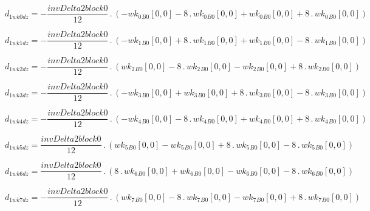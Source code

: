 \documentclass{article}
\begin{document}
\begin{dmath}d_{1 wk0 dz} = - \frac{invDelta2block0}{12} \,.\, \left(- {wk_{0}{_{B0}}}[{0,0}] - 8 \,.\, {wk_{0}{_{B0}}}[{0,0}] + {wk_{0}{_{B0}}}[{0,0}] + 8 \,.\, {wk_{0}{_{B0}}}[{0,0}]\right)\end{dmath}

\begin{dmath}d_{1 wk1 dz} = - \frac{invDelta2block0}{12} \,.\, \left(- {wk_{1}{_{B0}}}[{0,0}] + 8 \,.\, {wk_{1}{_{B0}}}[{0,0}] + {wk_{1}{_{B0}}}[{0,0}] - 8 \,.\, {wk_{1}{_{B0}}}[{0,0}]\right)\end{dmath}

\begin{dmath}d_{1 wk2 dz} = - \frac{invDelta2block0}{12} \,.\, \left({wk_{2}{_{B0}}}[{0,0}] - 8 \,.\, {wk_{2}{_{B0}}}[{0,0}] - {wk_{2}{_{B0}}}[{0,0}] + 8 \,.\, {wk_{2}{_{B0}}}[{0,0}]\right)\end{dmath}

\begin{dmath}d_{1 wk3 dz} = - \frac{invDelta2block0}{12} \,.\, \left(- {wk_{3}{_{B0}}}[{0,0}] + {wk_{3}{_{B0}}}[{0,0}] + 8 \,.\, {wk_{3}{_{B0}}}[{0,0}] - 8 \,.\, {wk_{3}{_{B0}}}[{0,0}]\right)\end{dmath}

\begin{dmath}d_{1 wk4 dz} = - \frac{invDelta2block0}{12} \,.\, \left(- {wk_{4}{_{B0}}}[{0,0}] - 8 \,.\, {wk_{4}{_{B0}}}[{0,0}] + {wk_{4}{_{B0}}}[{0,0}] + 8 \,.\, {wk_{4}{_{B0}}}[{0,0}]\right)\end{dmath}

\begin{dmath}d_{1 wk5 dz} = \frac{invDelta2block0}{12} \,.\, \left({wk_{5}{_{B0}}}[{0,0}] - {wk_{5}{_{B0}}}[{0,0}] + 8 \,.\, {wk_{5}{_{B0}}}[{0,0}] - 8 \,.\, {wk_{5}{_{B0}}}[{0,0}]\right)\end{dmath}

\begin{dmath}d_{1 wk6 dz} = \frac{invDelta2block0}{12} \,.\, \left(8 \,.\, {wk_{6}{_{B0}}}[{0,0}] + {wk_{6}{_{B0}}}[{0,0}] - {wk_{6}{_{B0}}}[{0,0}] - 8 \,.\, {wk_{6}{_{B0}}}[{0,0}]\right)\end{dmath}

\begin{dmath}d_{1 wk7 dz} = - \frac{invDelta2block0}{12} \,.\, \left({wk_{7}{_{B0}}}[{0,0}] - 8 \,.\, {wk_{7}{_{B0}}}[{0,0}] - {wk_{7}{_{B0}}}[{0,0}] + 8 \,.\, {wk_{7}{_{B0}}}[{0,0}]\right)\end{dmath}
\end{document}
